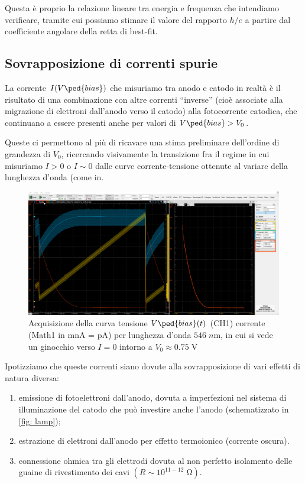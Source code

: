 \documentclass[10pt, a4paper, italian]{article}
\begin{document}
Questa è proprio la relazione lineare tra energia e frequenza che intendiamo
verificare, tramite cui possiamo stimare il valore del rapporto $h/e$ a
partire dal coefficiente angolare della retta di best-fit.

\subsection{Sovrapposizione di correnti spurie}
La corrente $I(V\ped{bias})$ che misuriamo tra anodo e catodo in realtà è il
risultato di una combinazione con altre correnti ``inverse'' (cioè
associate alla migrazione di elettroni dall'anodo verso il catodo) alla
fotocorrente catodica, che continuano a essere presenti anche per valori
di $V\ped{bias} > V_0$.

Queste ci permettono al più di ricavare una stima preliminare dell'ordine di
grandezza di $V_0$, ricercando visivamente la transizione fra il regime in cui
misuriamo $I>0$ o $I \sim 0$ dalle curve corrente-tensione ottenute al variare
della lunghezza d'onda (come in.

\begin{figure}[htbp]
    \centering
	\includegraphics[width=\textwidth]{546nm}
    \caption{Acquisizione della curva tensione $V\ped{bias}(t)$ (CH1)
    corrente (Math1 in mnA = pA) per lunghezza d'onda $546 \; \si{n\m}$, in
    cui si vede un ginocchio verso $I=0$ intorno a
    $V_0 \approx 0.75 \; \si{\V}$
    \label{fig: 546nm}}
\end{figure}

Ipotizziamo che queste correnti siano dovute alla sovrapposizione di vari
effetti di natura diversa:
\begin{enumerate}
        \item emissione di fotoelettroni dall'anodo, dovuta a imperfezioni nel
        sistema di illuminazione del catodo che può investire anche l'anodo
        (schematizzato in \cref{fig: lamp});
        \item estrazione di elettroni dall'anodo per effetto termoionico
        (corrente oscura).
        \item connessione ohmica tra gli elettrodi dovuta al non perfetto
        isolamento delle guaine di rivestimento dei cavi
        $(R \sim 10^{11-12} \; \si{\ohm})$.
    \end{enumerate}
\end{document}
